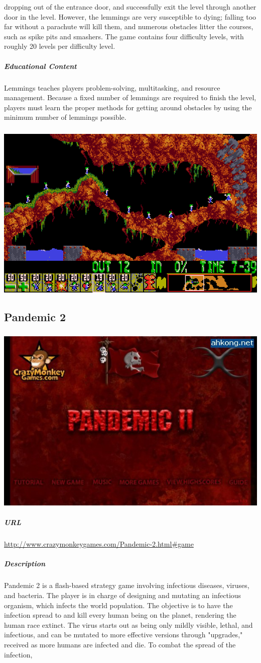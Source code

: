 dropping out of the entrance door, and successfully exit the level through another door in the level. However, the lemmings are very susceptible to dying; falling too far without a parachute will kill them, and numerous obstacles litter the courses, such as spike pits and smashers. The game contains four difficulty levels, with roughly 20 levels per difficulty level.\subparagraph{Educational Content}Lemmings teaches players problem-solving, multitasking, and resource management. Because a fixed number of lemmings are required to finish the level, players must learn the proper methods for getting around obstacles by using the minimum number of lemmings possible.\subparagraph{}\includegraphics[width = \textwidth]{img/lemmings_screen.jpg}\subsection{Pandemic 2}\subparagraph{}\includegraphics[width = \textwidth]{img/pandemic_title.jpg}\subparagraph{URL}\url{http://www.crazymonkeygames.com/Pandemic-2.html#game}\subparagraph{Description}Pandemic 2 is a flash-based strategy game involving infectious diseases, viruses, and bacteria. The player is in charge of designing and mutating an infectious organism, which infects the world population. The objective is to have the infection spread to and kill every human being on the planet, rendering the human race extinct. The virus starts out as being only mildly visible, lethal, and infectious, and can be mutated to more effective versions through "upgrades," received as more humans are infected and die. To combat the spread of the infection, 